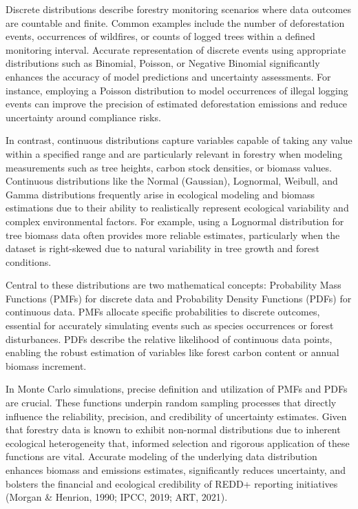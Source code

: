 \documentclass[
]{article}
\begin{document}
Discrete distributions describe forestry monitoring scenarios where data
outcomes are countable and finite. Common examples include the number of
deforestation events, occurrences of wildfires, or counts of logged
trees within a defined monitoring interval. Accurate representation of
discrete events using appropriate distributions such as Binomial,
Poisson, or Negative Binomial significantly enhances the accuracy of
model predictions and uncertainty assessments. For instance, employing a
Poisson distribution to model occurrences of illegal logging events can
improve the precision of estimated deforestation emissions and reduce
uncertainty around compliance risks.

In contrast, continuous distributions capture variables capable of
taking any value within a specified range and are particularly relevant
in forestry when modeling measurements such as tree heights, carbon
stock densities, or biomass values. Continuous distributions like the
Normal (Gaussian), Lognormal, Weibull, and Gamma distributions
frequently arise in ecological modeling and biomass estimations due to
their ability to realistically represent ecological variability and
complex environmental factors. For example, using a Lognormal
distribution for tree biomass data often provides more reliable
estimates, particularly when the dataset is right-skewed due to natural
variability in tree growth and forest conditions.

Central to these distributions are two mathematical concepts:
Probability Mass Functions (PMFs) for discrete data and Probability
Density Functions (PDFs) for continuous data. PMFs allocate specific
probabilities to discrete outcomes, essential for accurately simulating
events such as species occurrences or forest disturbances. PDFs describe
the relative likelihood of continuous data points, enabling the robust
estimation of variables like forest carbon content or annual biomass
increment.

In Monte Carlo simulations, precise definition and utilization of PMFs
and PDFs are crucial. These functions underpin random sampling processes
that directly influence the reliability, precision, and credibility of
uncertainty estimates. Given that forestry data is known to exhibit
non-normal distributions due to inherent ecological heterogeneity that,
informed selection and rigorous application of these functions are
vital. Accurate modeling of the underlying data distribution enhances
biomass and emissions estimates, significantly reduces uncertainty, and
bolsters the financial and ecological credibility of REDD+ reporting
initiatives (Morgan \& Henrion, 1990; IPCC, 2019; ART, 2021).
\end{document}
